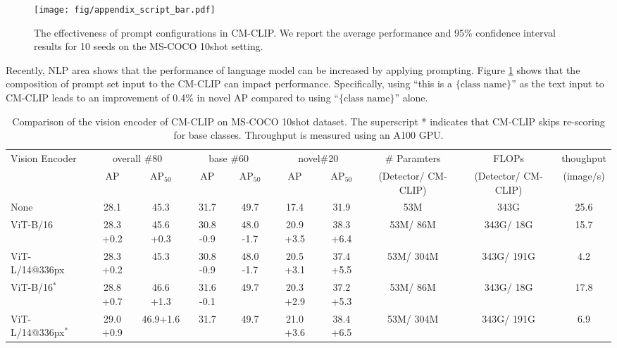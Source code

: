 \documentclass{article}
\begin{document}
\begin{figure}[h]
    \centering
    \texttt{[image: fig/appendix\_script\_bar.pdf]}
    \caption{The effectiveness of prompt configurations in CM-CLIP. We report the average performance and 95\% confidence interval results for 10 seeds on the MS-COCO 10shot setting.}
    \label{fig:enter-label}
\end{figure}

Recently, NLP area \cite{gpt, cot} shows that the performance of language model can be increased by applying prompting.
Figure \ref{fig:enter-label} shows that the composition of prompt set input to the CM-CLIP can impact performance.
Specifically, using ``this is a $\{\text{class name}\}$'' as the text input to CM-CLIP leads to an improvement of 0.4$\%$ in novel AP compared to using ``$\{\text{class name}\}$'' alone.

\begin{table}[h]
\caption{Comparison of the vision encoder of CM-CLIP on MS-COCO 10shot dataset. 
The superscript * indicates that CM-CLIP skips re-scoring for base classes. Throughput is measured using an A100 GPU.}
\centering
\begin{adjustbox}{width=1.0\textwidth}
{
\begin{tabular}{l|cc|cc|cc|c|c|c}
     \toprule
     \multirow{2}{*}{Vision Encoder}& \multicolumn{2}{c|}{overall \#80} &\multicolumn{2}{c|}{base \#60}&\multicolumn{2}{c|}{novel\#20}& \multirow{1}{*}{\# Paramters} & \multirow{1}{*}{FLOPs }& {thoughput} \\
      & AP & AP$_{50}$ & AP & AP$_{50}$ & AP & AP$_{50}$ & (Detector/ CM-CLIP) & (Detector/ CM-CLIP) & (image/s) \\
     \hline
     None &28.1&45.3&31.7&49.7&17.4&31.9&  53M &343G &25.6 \\
     ViT-B/16 &28.3 {\scriptsize \color{red}+0.2}&45.6 {\scriptsize \color{red}+0.3}&30.8 {\scriptsize \color{blue}-0.9} &48.0 {\scriptsize \color{blue}-1.7}&20.9 {\scriptsize \color{red}+3.5}&38.3 {\scriptsize \color{red}+6.4}&  53M/ 86M &343G/ 18G&15.7  \\
     ViT-L/14@336px &28.3 {\scriptsize \color{red}+0.2}&45.3&30.8 {\scriptsize \color{blue}-0.9}&48.0 {\scriptsize \color{blue}-1.7}&20.5 {\scriptsize \color{red}+3.1}&37.4 {\scriptsize \color{red}+5.5}&  53M/ 304M &343G/ 191G&4.2\\
     \hline
     ViT-B/16$^*$ &28.8 {\scriptsize \color{red}+0.7}&46.6 {\scriptsize \color{red}+1.3}&31.6 {\scriptsize \color{blue}-0.1} &49.7&20.3 {\scriptsize \color{red}+2.9}&37.2 {\scriptsize \color{red}+5.3}&  53M/ 86M &343G/ 18G&17.8  \\
     ViT-L/14@336px$^*$ &29.0 {\scriptsize \color{red}+0.9}&46.9{\scriptsize \color{red}+1.6}&31.7 &49.7&21.0 {\scriptsize \color{red}+3.6}&38.4 {\scriptsize \color{red}+6.5}&  53M/ 304M &343G/ 191G&6.9\\
     \bottomrule
\end{tabular}
}
\end{adjustbox}
\label{tab:cmclip}
\end{table}
\end{document}
